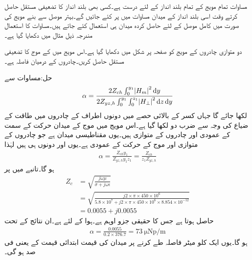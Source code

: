 مساوات  تمام مویج کے تمام بلند انداز کے لئے درست ہے۔کسی بھی بلند انداز کا تضعیفی مستقل حاصل کرتے وقت اسی بلند انداز کے میدان مساوات  میں پر کئے جائیں گے۔بہتر موصل سے بنے مویج کی صورت میں کامل موصل کے لئے حاصل کردہ میدان ہی استعمال کئے جاتے ہیں۔مساوات  کا استعمال مندرجہ ذیل مثال میں دکھایا گیا ہے۔

دو متوازی چادروں کے مویج کو صفحہ  پر شکل  میں دکھایا گیا ہے۔اس مویج میں  کے  موج کا تضعیفی مستقل حاصل کریں۔چادروں کے درمیان فاصلہ  ہے۔

حل:مساوات   سے
\begin{align*}
\alpha=\frac{2 Z_{ch} \int_0^{y_1} \abs{H_m}^2 \dif y}{2 Z_{yz,h} \int_0^{y_1} \int_0^{z_1} \abs{H_{\perp}}^2 \dif z \dif y}
\end{align*}
لکھا جائے گا جہاں کسر کے بالائی حصے میں دونوں اطراف کے چادروں میں طاقت کے ضیاع کی وجہ سے ضرب دو لکھا گیا ہے۔اس مویج میں  موج کے میدان حرکت کے سمت کے عمودی اور چادروں کے متوازی ہیں۔یوں مقناطیسی میدان  ہے جو چادروں کے متوازی اور موج کے حرکت کے عمودی ہے۔یوں  اور  دونوں   ہی ہیں لہٰذا
 \begin{align*}
\alpha=\frac{Z_{ch} y_1}{Z_{yz,h} y_1 z_1}=\frac{Z_{ch}}{z_1 Z_{yz,h}}
\end{align*}
ہو گا۔تانبے میں  پر
\begin{align*}
Z_{c}&=\sqrt{\frac{j\omega \mu}{\sigma+j\omega \epsilon}}\\
&=\sqrt{\frac{j 2 \times \pi \times 450 \times 10^{6}}{5.8\times 10^{7}+j 2\times \pi \times 450 \times 10^{6} \times 8.854 \times 10^{-12}}}\\
&=0.0055+j0.0055
\end{align*}
حاصل ہوتا ہے جس کا حقیقی جزو  اوہم ہے۔ہوا کے لئے  ہے۔ان نتائج کے تحت
 \begin{align*}
\alpha=\frac{0.0055}{0.2 \times  376.7}=\SI{73}{\micro\neper/\meter}
\end{align*}
ہو گا۔یوں ایک کلو میٹر فاصلہ طے کرنے پر میدان کی قیمت ابتدائی قیمت کے  یعنی  فی صد ہو گی۔

